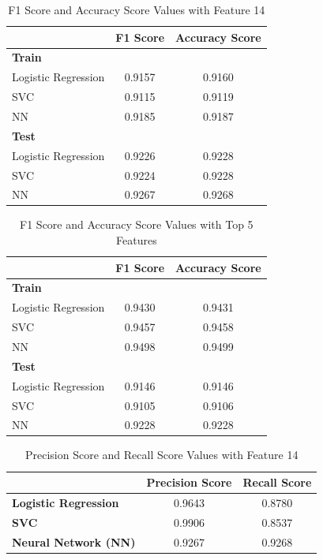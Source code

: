 \documentclass[conference]{IEEEtran}
\begin{document}
\begin{table}[htbp]
\centering
\begin{tabular}{@{}lcc@{}}
\toprule
 & \textbf{F1 Score} & \textbf{Accuracy Score} \\ \midrule
\textbf{Train} &  &  \\
\quad Logistic Regression & 0.9157 & 0.9160 \\
\quad SVC & 0.9115 & 0.9119 \\
\quad NN & 0.9185 & 0.9187 \\
\textbf{Test} &  &  \\
\quad Logistic Regression & 0.9226 & 0.9228 \\
\quad SVC & 0.9224 & 0.9228 \\
\quad NN & 0.9267 & 0.9268 \\ \bottomrule
\end{tabular}
\caption{F1 Score and Accuracy Score Values with Feature 14}
\label{tab:svm-comparison}
\end{table}

\begin{table}[htbp]
\centering
\begin{tabular}{@{}lcc@{}}
\toprule
 & \textbf{F1 Score} & \textbf{Accuracy Score} \\ \midrule
\textbf{Train} &  &  \\
\quad Logistic Regression & 0.9430 & 0.9431 \\
\quad SVC & 0.9457 & 0.9458 \\
\quad NN & 0.9498 & 0.9499 \\
\textbf{Test} &  &  \\
\quad Logistic Regression & 0.9146 & 0.9146 \\
\quad SVC & 0.9105 & 0.9106 \\
\quad NN & 0.9228 & 0.9228 \\ \bottomrule
\end{tabular}
\caption{F1 Score and Accuracy Score Values with Top 5 Features}
\label{tab:svm-comparison}
\end{table}

\begin{table}[H]
\centering
\begin{tabular}{@{}lcc@{}}
\toprule
\textbf{} & \textbf{Precision Score} & \textbf{Recall Score} \\ \midrule
\textbf{Logistic Regression} & 0.9643 & 0.8780 \\
\textbf{SVC} & 0.9906 & 0.8537 \\
\textbf{Neural Network (NN)} & 0.9267 & 0.9268 \\ \bottomrule
\end{tabular}
\caption{Precision Score and Recall Score Values with Feature 14}
\label{tab:svm-comparison}
\end{table}
\end{document}
